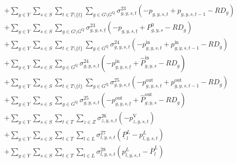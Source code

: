 \documentclass{article}
\newcommand{\sGenerators}{G}
\newcommand{\sStorage}{G^{\mathrm{Q}}}
\newcommand{\sYears}{Y}
\newcommand{\sScenarios}{S}
\newcommand{\sIntervals}{T}
\newcommand{\sZones}{Z}
\newcommand{\sLinks}{L}
\newcommand{\iGenerator}{g}
\newcommand{\iYear}{y}
\newcommand{\iScenario}{s}
\newcommand{\iInterval}{t}
\newcommand{\iIntervalTerminal}{\overline{\iInterval}}
\newcommand{\iIntervalStart}{\underline{\iInterval}}
\newcommand{\iZone}{z}
\newcommand{\iLink}{l}
\newcommand{\cRampRateDown}[1][\iGenerator]{RD_{#1}}
\newcommand{\cPowerFlowMin}{\underline{P}_{\iLink}^{L}}
\newcommand{\cPowerFlowMax}{\overline{P}_{\iLink}^{L}}
\newcommand{\cPowerInitial}[1][\iGenerator,\iYear,\iScenario]{P_{#1}^{0}}
\newcommand{\cPowerOutInitial}[1][\iGenerator,\iYear,\iScenario]{\hat{P}_{#1}^{\mathrm{out}}}
\newcommand{\cPowerInInitial}[1][\iGenerator,\iYear,\iScenario]{\hat{P}_{#1}^{\mathrm{in}}}
\newcommand{\vPower}[1][\iGenerator,\iYear,\iScenario,\iInterval]{p_{#1}}
\newcommand{\vPowerIn}[1][\iGenerator,\iYear,\iScenario,\iInterval]{p^{\mathrm{in}}_{#1}}
\newcommand{\vPowerOut}[1][\iGenerator,\iYear,\iScenario,\iInterval]{p^{\mathrm{out}}_{#1}}
\newcommand{\vPowerFlow}[1][\iLink,\iYear,\iScenario,\iInterval]{p^{\sLinks}_{#1}}
\newcommand{\vLostLoadPower}[1][\iZone,\iYear,\iScenario,\iInterval]{p^{\mathrm{V}}_{#1}}
\newcommand{\dRampRateDown}[1][\iGenerator,\iYear,\iScenario,\iInterval]{\sigma_{#1}^{23}}
\newcommand{\dRampRateDownStorageCharging}[1][\iGenerator,\iYear,\iScenario,\iInterval]{\sigma_{#1}^{24}}
\newcommand{\dRampRateDownStorageDischarging}[1][\iGenerator,\iYear,\iScenario,\iInterval]{\sigma_{#1}^{25}}
\newcommand{\dNonNegativeLostLoad}[1][\iZone,\iYear,\iScenario,\iInterval]{\sigma_{#1}^{26}}
\newcommand{\dMinPowerFlow}[1][\iLink,\iYear,\iScenario,\iInterval]{\sigma_{#1}^{27}}
\newcommand{\dMaxPowerFlow}[1][\iLink,\iYear,\iScenario,\iInterval]{\sigma_{#1}^{28}}
\begin{document}
\begin{align}
		& + \sum\limits_{\iYear \in \sYears}\sum\limits_{\iScenario \in \sScenarios}\sum\limits_{\iInterval \in \sIntervals \setminus \{\iIntervalStart\}} \sum\limits_{\iGenerator \in \sGenerators \setminus \sStorage} \dRampRateDown \left(- \vPower + \vPower[\iGenerator,\iYear,\iScenario,\iInterval-1] - \cRampRateDown\right)\\
		& + \sum\limits_{\iYear \in \sYears}\sum\limits_{\iScenario \in \sScenarios} \sum\limits_{\iGenerator \in \sGenerators \setminus \sStorage} \dRampRateDown[\iGenerator,\iYear,\iScenario,\iIntervalStart] \left(- \vPower[\iGenerator,\iYear,\iScenario,\iIntervalStart] + \cPowerInitial - \cRampRateDown\right)\\
		& +  \sum\limits_{\iYear \in \sYears}\sum\limits_{\iScenario \in \sScenarios} \sum\limits_{\iInterval \in \sIntervals \setminus \{\iIntervalTerminal\}} \sum\limits_{\iGenerator \in \sStorage} \dRampRateDownStorageCharging \left(- \vPowerIn + \vPowerIn[\iGenerator,\iYear,\iScenario,\iInterval-1] - \cRampRateDown\right) \\
		& +  \sum\limits_{\iYear \in \sYears}\sum\limits_{\iScenario \in \sScenarios} \sum\limits_{\iGenerator \in \sStorage} \dRampRateDownStorageCharging \left(- \vPowerIn[\iGenerator,\iYear,\iScenario,\iIntervalStart] + \cPowerInInitial - \cRampRateDown\right) \\
		& +  \sum\limits_{\iYear \in \sYears}\sum\limits_{\iScenario \in \sScenarios} \sum\limits_{\iInterval \in \sIntervals \setminus \{\iIntervalTerminal\}} \sum\limits_{\iGenerator \in \sStorage} \dRampRateDownStorageDischarging \left(- \vPowerOut + \vPowerOut[\iGenerator,\iYear,\iScenario,\iInterval-1] - \cRampRateDown\right) \\
		& +  \sum\limits_{\iYear \in \sYears}\sum\limits_{\iScenario \in \sScenarios} \sum\limits_{\iGenerator \in \sStorage} \dRampRateDownStorageDischarging \left(- \vPowerOut[\iGenerator,\iYear,\iScenario,\iIntervalStart] + \cPowerOutInitial - \cRampRateDown\right) \\
		& + \sum\limits_{\iYear \in \sYears}\sum\limits_{\iScenario \in \sScenarios}\sum\limits_{\iInterval \in \sIntervals} \sum\limits_{\iZone \in \sZones} \dNonNegativeLostLoad \left(- \vLostLoadPower\right)\\
		& + \sum\limits_{\iYear \in \sYears}\sum\limits_{\iScenario \in \sScenarios}\sum\limits_{\iInterval \in \sIntervals} \sum\limits_{\iLink \in \sLinks} \dMinPowerFlow \left(\cPowerFlowMin - \vPowerFlow\right)\\
		& + \sum\limits_{\iYear \in \sYears}\sum\limits_{\iScenario \in \sScenarios}\sum\limits_{\iInterval \in \sIntervals} \sum\limits_{\iLink \in \sLinks} \dMaxPowerFlow \left(\vPowerFlow - \cPowerFlowMax\right)\\
\end{align}
\end{document}
